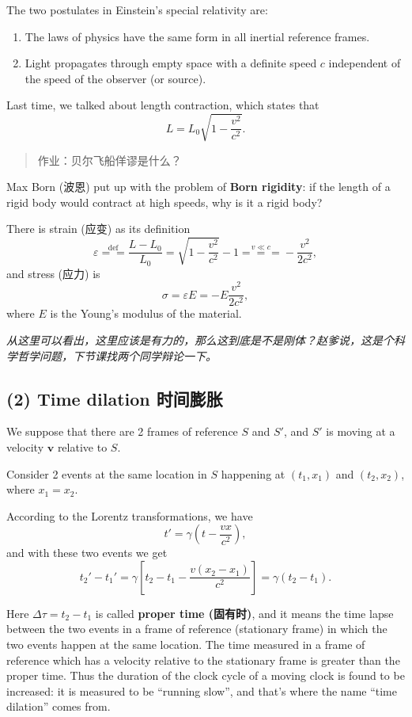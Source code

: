 The two postulates in Einstein's special relativity are:

\begin{enumerate}
\def\labelenumi{\arabic{enumi}.}
\tightlist{}
\item
  The laws of physics have the same form in all inertial reference
  frames.
\item
  Light propagates through empty space with a definite speed \(c\)
  independent of the speed of the observer (or source).
\end{enumerate}

Last time, we talked about length contraction, which states that
\[L = L_0 \sqrt{1 - \frac{v^2}{c^2}}.\]

\begin{quote}
作业：贝尔飞船佯谬是什么？
\end{quote}

Max Born (波恩) put up with the problem of \textbf{Born rigidity}: if
the length of a rigid body would contract at high speeds, why is it a
rigid body?

There is strain (应变) as its definition
\[\varepsilon \overset{\text{def}}{=\!=} \frac{L - L_0}{L_0} = \sqrt{1 - \frac{v^2}{c^2}} - 1 \overset{v \ll c}{=\!=\!=} - \frac{v^2}{2 c^2},\]
and stress (应力) is \[\sigma = \varepsilon E = - E \frac{v^2}{2 c^2},\]
where \(E\) is the Young's modulus of the material.

\emph{从这里可以看出，这里应该是有力的，那么这到底是不是刚体？赵爹说，这是个科学哲学问题，下节课找两个同学辩论一下。}

\subsection*{(2) Time dilation
时间膨胀}\label{time-dilation-ux65f6ux95f4ux81a8ux80c0}

We suppose that there are 2 frames of reference \(S\) and \(S'\), and
\(S'\) is moving at a velocity \(\boldsymbol{v}\) relative to \(S\).

Consider 2 events at the same location in \(S\) happening at
\((t_1, x_1)\) and \((t_2, x_2)\), where \(x_1 = x_2\).

According to the Lorentz transformations, we have
\[t' = \gamma \left( t - \frac{vx}{c^2} \right),\] and with these two
events we get
\[t_2' - t_1' = \gamma \left[ t_2 - t_1 - \frac{v(x_2 - x_1)}{c^2} \right] = \gamma (t_2 - t_1).\]

Here \(\Delta \tau = t_2 - t_1\) is called \textbf{proper time
(固有时)}, and it means the time lapse between the two events in a frame
of reference (stationary frame) in which the two events happen at the
same location. The time measured in a frame of reference which has a
velocity relative to the stationary frame is greater than the proper
time. Thus the duration of the clock cycle of a moving clock is found to
be increased: it is measured to be ``running slow'', and that's where
the name ``time dilation'' comes from.

